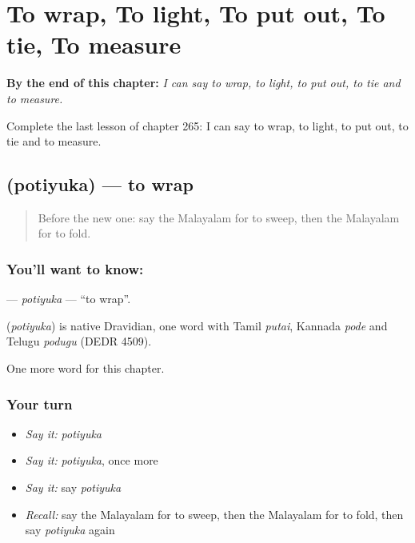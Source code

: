 
\chapter{To wrap, To light, To put out, To tie, To measure}
\label{ch:ml-to-wrap-to-light-to-put-out-to-tie-to-measure}

\begin{chapteropening}
\textbf{By the end of this chapter:} \emph{I can say to wrap, to light, to put out, to tie and to measure.}

Complete the last lesson of chapter 265: I can say to wrap, to light, to put out, to tie and to measure.
\end{chapteropening}

\section[\texorpdfstring{\ml{പൊതിയുക} (potiyuka)}{പൊതിയുക (potiyuka)}]{ (potiyuka) — to wrap}

\label{lesson:ML-C265-potiyuka}



\begin{quote}
Before the new one: say the Malayalam for to sweep, then the Malayalam for to fold.
\end{quote}

\subsection*{You'll want to know: }
\textbf{} — \emph{potiyuka} — \textquotedblleft{}to wrap\textquotedblright{}.

\begin{cousinweb}
\textbf{} (\emph{potiyuka}) is native Dravidian, one word with Tamil \emph{putai}, Kannada \emph{pode} and Telugu \emph{podugu} (DEDR 4509).
\end{cousinweb}

\begin{grammarlens}[title={What you've built}]
One more word for this chapter.
\end{grammarlens}

\subsection*{Your turn}
\begin{itemize}
\raggedright
  \item \emph{Say it:} \emph{potiyuka}
  \item \emph{Say it:} \emph{potiyuka}, once more
  \item \emph{Say it:} say \emph{potiyuka}
  \item \emph{Recall:} say the Malayalam for to sweep, then the Malayalam for to fold, then say \emph{potiyuka} again
\end{itemize}

